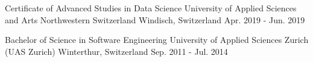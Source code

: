 {
}

\begin{cventries}

  	\cventry
  	{
  		{Certificate of Advanced Studies in Data Science}
  	} %
  	{
  		{University of Applied Sciences and Arts Northwestern Switzerland}
  	} %
  	{
  		{Windisch, Switzerland}
  	} %
  	{
  		{Apr. 2019 - Jun. 2019}
  	} %
  	{
  	}
  
  	\cventry
    {
    	{Bachelor of Science in Software Engineering}
    } %
    {
    	{University of Applied Sciences Zurich (UAS Zurich)}
    } %
    {
    	{Winterthur, Switzerland}
    } %
    {
    	{Sep. 2011 - Jul. 2014}
    } %
    {
    }


\end{cventries}
